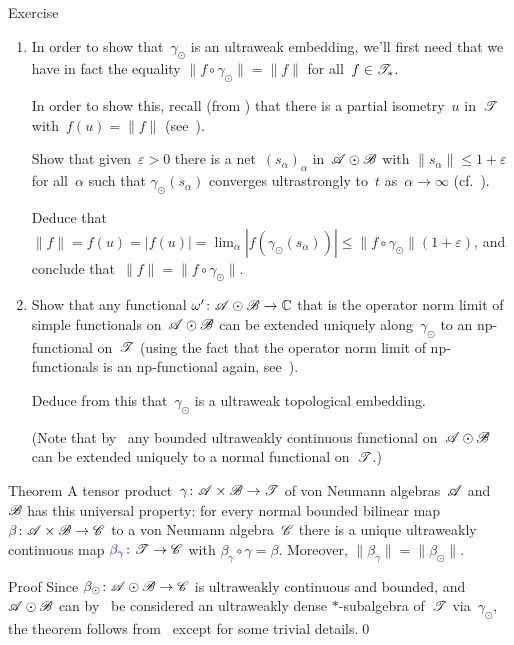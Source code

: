 \documentclass[a]{subfiles}
\begin{document}
\begin{parsec}
\begin{point}{Exercise}
\begin{enumerate}
\item
In order to show that~$\gamma_\odot$ is an ultraweak embedding,
we'll first need that we have
in fact the equality $\|f\circ \gamma_\odot\|=\|f\|$
for all~$f\in\mathscr{T}_*$.

In order to show this,
recall 
(from )
that there is a partial isometry~$u$ in~$\mathscr{T}$
with~$f(u)=\|f\|$ (see~). 

Show that given~$\varepsilon>0$ 
there is a net~$(s_\alpha)_\alpha$
in~$\mathscr{A}\odot\mathscr{B}$
with $\|s_\alpha\|\leq 1+\varepsilon$ for all~$\alpha$
such that $\gamma_\odot(s_\alpha)$
converges ultrastrongly to~$t$ as~$\alpha\to\infty$
(cf.~).

Deduce that $\|f\|=f(u)=\left|f(u)\right|
=\lim_\alpha \left|f(\gamma_\odot(s_\alpha))\right|
\leq \|f\circ \gamma_\odot\| (1+\varepsilon)$,
and
conclude that~$\|f\|=\|f\circ\gamma_\odot\|$.

\item
Show that any functional $\omega'\colon \mathscr{A}\odot\mathscr{B}\to\mathbb{C}$
that is the operator norm limit of simple functionals
on~$\mathscr{A}\odot\mathscr{B}$
can be extended uniquely along~$\gamma_\odot$
to an np-functional on~$\mathscr{T}$
(using the fact that the operator
norm limit of np-functionals is an np-functional again,
see~).

Deduce from this that~$\gamma_\odot$ is a ultraweak topological embedding.

(Note that by~ any 
bounded ultraweakly continuous functional
on~$\mathscr{A}\odot\mathscr{B}$ can be extended uniquely
to a normal functional on~$\mathscr{T}$.)
\end{enumerate}
\end{point}
\begin{point}{Theorem}%
A tensor product~$\gamma\colon \mathscr{A}\times\mathscr{B}\to\mathscr{T}$
of von Neumann algebras~$\mathscr{A}$ and~$\mathscr{B}$
has this universal property:
for every normal bounded bilinear map $\beta\colon \mathscr{A}\times \mathscr{B}\to\mathscr{C}$
to a von Neumann algebra~$\mathscr{C}$
there is a unique ultraweakly continuous
map  $\Define{\beta_\gamma}\colon \scrT
\to \scrC$ with $\beta_\gamma\circ \gamma  = \beta$.
Moreover, $\|\beta_\gamma\|=\|\beta_\odot\|$.
\begin{point}{Proof}%
Since $\beta_\odot\colon \mathscr{A}\odot\mathscr{B}\to\mathscr{C}$
is ultraweakly continuous and bounded,
and
$\mathscr{A}\odot\mathscr{B}$
can by~ be
considered an ultraweakly dense $*$-subalgebra
of~$\mathscr{T}$ via~$\gamma_\odot$,
the theorem follows from~
except for some trivial details.\qed
\end{point}
\end{point}
\end{parsec}%
\end{document}

